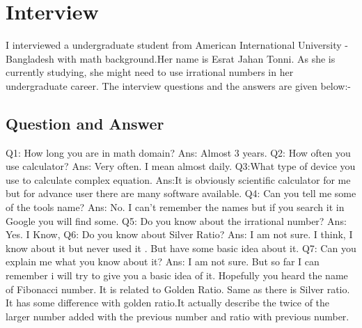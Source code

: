 \section{Interview}
I interviewed a undergraduate student from American International University - Bangladesh with math background.Her name is Esrat Jahan Tonni. As she is currently studying, she might need to use irrational numbers in her undergraduate career. The interview questions and the answers are given below:- \newline

\subsection{Question and Answer}
Q1: How long you are in math domain?\newline
Ans: Almost 3 years.\newline\newline
Q2: How often you use calculator?\newline
Ans: Very often. I mean almost daily.\newline \newline
Q3:What type of device you use to calculate complex equation.\newline
Ans:It is obviously scientific calculator for me but for advance user there are many software available.\newline\newline
Q4: Can you tell me some of the tools name?\newline
Ans: No. I can't remember the names but if you search it in Google you will find some.\newline\newline
Q5: Do you know about the irrational number?\newline
Ans: Yes. I Know,\newline\newline
Q6: Do you know about Silver Ratio?\newline
Ans: I am not sure. I think, I know about it but never used it . But have some basic idea about it. \newline\newline
Q7: Can you explain me what you know about it?\newline
Ans: I am not sure. But so far I can remember i will try to give you a basic idea of it. Hopefully you heard the name of Fibonacci number. It is related to Golden Ratio. Same as there is Silver ratio. It has some difference with golden ratio.It actually describe the twice  of the larger number added with the previous number and ratio with previous number.\newline\newline
